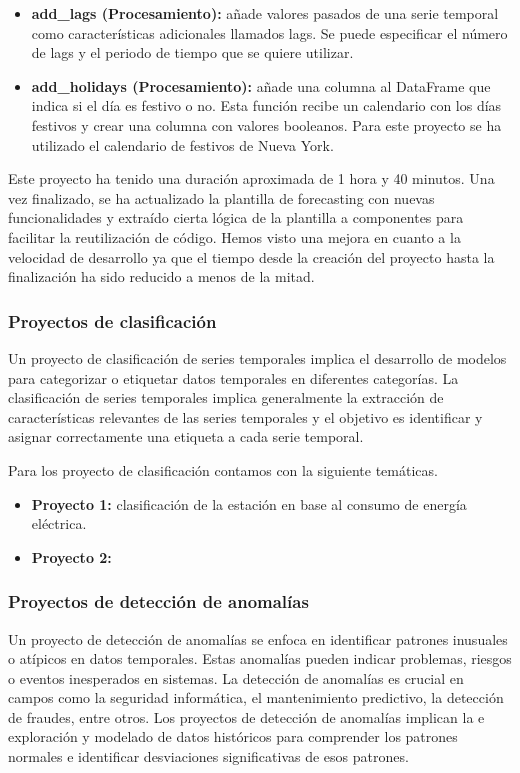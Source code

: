\begin{itemize}
    \item \textbf{add\_lags (Procesamiento):} añade valores pasados de una serie temporal
    como características adicionales llamados lags. Se puede especificar el número de lags
    y el periodo de tiempo que se quiere utilizar.
    \item \textbf{add\_holidays (Procesamiento):} añade una columna al DataFrame que indica
    si el día es festivo o no. Esta función recibe un calendario con los días festivos
    y crear una columna con valores booleanos. Para este proyecto se ha utilizado el calendario
    de festivos de Nueva York.
\end{itemize}

Este proyecto ha tenido una duración aproximada de 1 hora y 40 minutos. Una vez finalizado,
se ha actualizado la plantilla de forecasting con nuevas funcionalidades y extraído cierta
lógica de la plantilla a componentes para facilitar la reutilización de código. Hemos visto
una mejora en cuanto a la velocidad de desarrollo ya que el tiempo desde la creación del proyecto
hasta la finalización ha sido reducido a menos de la mitad.

\subsubsection{Proyectos de clasificación}
Un proyecto de clasificación de series temporales implica el desarrollo de modelos para 
categorizar o etiquetar datos temporales en diferentes categorías. La clasificación de 
series temporales implica generalmente la extracción de características relevantes 
de las series temporales y el objetivo es identificar y asignar correctamente una 
etiqueta a cada serie temporal.

Para los proyecto de clasificación contamos con la siguiente temáticas.
\begin{itemize}
    \item \textbf{Proyecto 1:} clasificación de la estación en base al consumo de energía eléctrica. 
    \item \textbf{Proyecto 2:}
\end{itemize}

\subsubsection{Proyectos de detección de anomalías}
Un proyecto de detección de anomalías se enfoca en identificar patrones inusuales o 
atípicos en datos temporales. Estas anomalías pueden indicar problemas, riesgos o 
eventos inesperados en sistemas. La detección de anomalías 
es crucial en campos como la seguridad informática, el mantenimiento predictivo, la 
detección de fraudes, entre otros. Los proyectos de detección de anomalías implican la e
exploración y modelado de datos históricos para comprender los patrones normales e identificar 
desviaciones significativas de esos patrones. 

